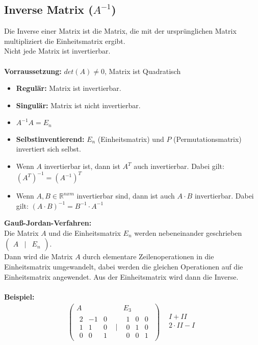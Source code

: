 \documentclass[12pt,a4paper]{article}
\begin{document}
\subsection{Inverse Matrix ($A^{-1}$)}
Die Inverse einer Matrix ist die Matrix, die mit der ursprünglichen Matrix multipliziert die Einheitsmatrix ergibt. \\
Nicht jede Matrix ist invertierbar. \\ \\
\textbf{Vorraussetzung:} $det(A) \neq 0$, Matrix ist Quadratisch \\
\begin{itemize}
    \item \textbf{Regulär:} Matrix ist invertierbar.
    \item \textbf{Singulär:} Matrix ist nicht invertierbar.
    \item $A^{-1}A=E_n$
    \item \textbf{Selbstinventierend:} $E_n$ (Einheitsmatrix) und $P$ (Permutationsmatrix) invertiert sich selbst.
    \item Wenn $A$ invertierbar ist, dann ist $A^T$ auch invertierbar. Dabei gilt: $(A^T)^{-1} = (A^{-1})^T$
    \item Wenn $A, B \in \mathbb{R}^{nxm} $ invertierbar sind, dann ist auch $A \cdot B$ invertierbar. Dabei gilt: $(A \cdot B)^{-1} = B^{-1} \cdot A^{-1}$
\end{itemize}
\textbf{Gauß-Jordan-Verfahren:} \\
Die Matrix $A$ und die Einheitsmatrix $E_n$ werden nebeneinander geschrieben $\begin{pmatrix}A & \vert & E_n\end{pmatrix}$. \\
Dann wird die Matrix $A$ durch elementare Zeilenoperationen in die Einheitsmatrix umgewandelt, dabei werden die gleichen Operationen auf die Einheitsmatrix angewendet. Aus der Einheitsmatrix wird dann die Inverse. \\ \\
\newpage
\textbf{Beispiel:}
\[
\begin{matrix}
    \begin{pmatrix}
        A && E_3\\
        \begin{matrix}
            2 & -1 & 0 \\
            1 & 1 & 0 \\
            0 & 0 & 1
        \end{matrix} & \vert &
        \begin{matrix}
            1 & 0 & 0 \\
            0 & 1 & 0 \\
            0 & 0 & 1
        \end{matrix}
    \end{pmatrix}
    &
    \begin{matrix}
        I + II \\
        2 \cdot II - I \\
    \end{matrix}
\end{matrix}
\]
\end{document}
